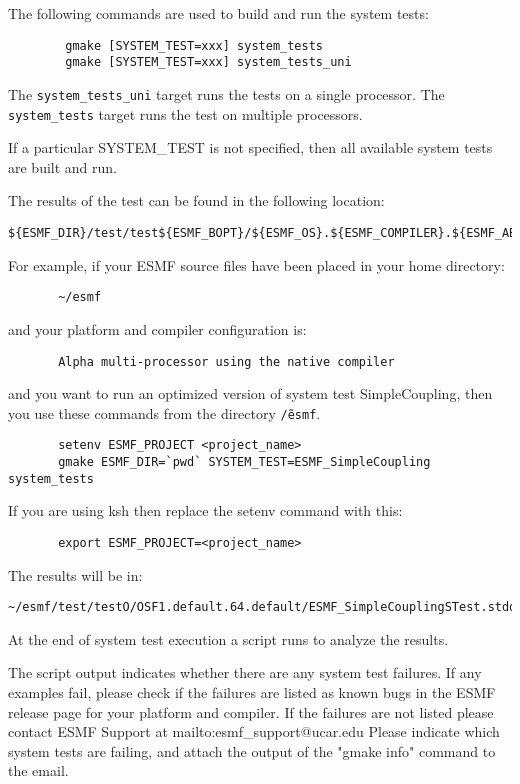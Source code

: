The following commands are used to build and run the system tests:

\begin{verbatim}
        gmake [SYSTEM_TEST=xxx] system_tests
        gmake [SYSTEM_TEST=xxx] system_tests_uni
\end{verbatim}

The {\tt system\_tests\_uni} target runs the tests on a single processor. 
The {\tt system\_tests} target runs the test on multiple processors.

If a particular SYSTEM\_TEST is not specified, then all available system tests 
are built and run.

The results of the test can be found in the following location:
\begin{verbatim}
${ESMF_DIR}/test/test${ESMF_BOPT}/${ESMF_OS}.${ESMF_COMPILER}.${ESMF_ABI}.${ESMF_SITE}
\end{verbatim}

For example, if your ESMF source files have been placed in your home directory:
\begin{verbatim}
       ~/esmf
\end{verbatim}

and your platform and compiler configuration is:
\begin{verbatim}
       Alpha multi-processor using the native compiler
\end{verbatim}

and you want to run an optimized version of system test SimpleCoupling,
then you use these commands from the directory {\tt \~/esmf}. 
\begin{verbatim}
       setenv ESMF_PROJECT <project_name>
       gmake ESMF_DIR=`pwd` SYSTEM_TEST=ESMF_SimpleCoupling system_tests
\end{verbatim}

If you are using ksh then replace the setenv command with
this:

\begin{verbatim}
       export ESMF_PROJECT=<project_name>
\end{verbatim}

The results will be in:
\begin{verbatim}
~/esmf/test/testO/OSF1.default.64.default/ESMF_SimpleCouplingSTest.stdout
\end{verbatim}

At the end of system test execution a script runs to analyze the results.


The script output indicates whether there are any system test failures.
If any examples fail, please check if the failures are listed as known bugs in the ESMF release
page 
for your platform and compiler.
If the failures are not listed please contact ESMF Support at 
{mailto:esmf\_support@ucar.edu}
Please indicate which system tests are failing, and attach the output of the "gmake info" command to the email.




